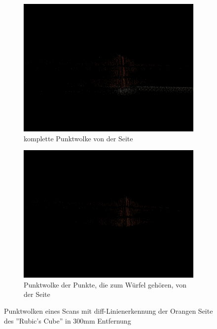 \documentclass[ngerman,a4paper,parskip=half]{scrartcl}
\begin{document}
\begin{figure}[H]
\begin{subfigure}{0.45\textwidth}
		\includegraphics[width=\textwidth]{includes/diff_orange_300_pos1.png}
		\caption{komplette Punktwolke von der Seite}
	\end{subfigure}
	\hfill
	\begin{subfigure}{0.45\textwidth}
		\includegraphics[width=\textwidth]{includes/diff_only_orange_300_pos1.png}
		\caption{Punktwolke der Punkte, die zum Würfel gehören, von der Seite}
	\end{subfigure}
	\caption{Punktwolken eines Scans mit diff-Linienerkennung der Orangen Seite des ''Rubic's Cube'' in 300mm Entfernung}
\end{figure}
\end{document}
